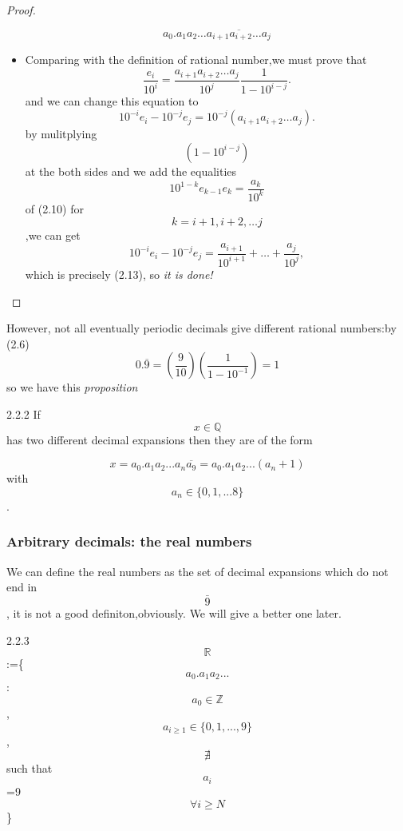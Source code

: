 \documentclass[a4paper]{article}
\begin{document}
\begin{proof}
\begin{itemize}
            \begin{equation}
                a_0.a_1a_2\ldots \overline{a_{i+1}a_{i+2}\ldots  a_j} \tag{2.12}
            \end{equation}
        \item Comparing with the definition of rational number,we must prove that
            \begin{equation*}
                \frac{e_i}{10^i}=\frac{a_{i+1}a_{i+2}\ldots a_j}{10^j}\frac{1}{1-10^{i-j}}.
            \end{equation*}
            and we can change this equation to 
            \begin{equation}
                10^{-i}e_i-10^{-j}e_j=10^{-j}(a_{i+1}a_{i+2}\ldots a_j).\tag{2.13}
            \end{equation}
            by mulitplying $$(1-10^{i-j})$$ at the both sides and we add the equalities $$10^{1-k}e_{k-1}e_k=\frac{a_k}{10^k}$$ of (2.10) for $$k=i+1,i+2,\ldots j$$,we can get
            \begin{equation*}
                10^{-i}e_i-10^{-j}e_j=\frac{a_{i+1}}{10^{i+1}}+\ldots+\frac{a_j}{10^j},
            \end{equation*}
            which is precisely (2.13), so \textit{it is done!}
    \end{itemize}
\end{proof}
    However, not all eventually periodic decimals give different rational numbers:by (2.6)
    \begin{equation*}
        0.\overline{9}=\left(\frac{9}{10}\right)\left(\frac{1}{1-10^{-1}}\right)=1
    \end{equation*}
    so we have this \textit{proposition}
\begin{proposition}{2.2.2}{}
    If $$x\in \mathbb{Q}$$ has two different decimal expansions then they are of the form 
    \begin{center}
        $$x=a_0.a_1a_2...a_n \overline{a_9}=a_0.a_1a_2...(a_n+1)$$ with $$a_n\in \{0,1,...8\}$$.
    \end{center}
\end{proposition}
\subsubsection{Arbitrary decimals: the real numbers}
We can define the real numbers as the set of decimal expansions which do not end in $$\bar{9}$$, it is not a good definiton,obviously. We will give a better one later.
\begin{definition}{2.2.3}{}
    $$\mathbb{R}$$:=\{$$a_0.a_1a_2...$$ : $$a_0\in \mathbb{Z}$$, $$a_{i \geq 1}\in \{0,1,...,9\}$$, $$\nexists $$ such that $$a_i$$=9 $$\forall i \geq N$$\}
\end{definition}
\end{document}
